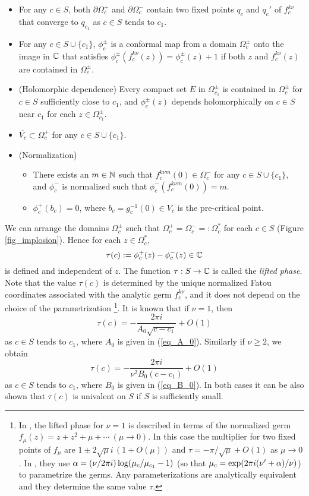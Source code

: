 \begin{itemize}
\item
For any $c \in S$,
both $\partial \Omega_c^+$ and $\partial \Omega_c^-$ contain two fixed points $q_c$ and $q_c'$ 
of $f_c^{k\nu}$ that converge to $q_{c_1}$ as $c \in S$ tends to  $c_1$.
\item 
For any $c \in S \cup \{c_1\}$, 
$\phi_c^\pm$ is a conformal map from a domain $\Omega_c^\pm$ onto the image in $\mathbb C$ that satisfies
$\phi_c^\pm(f_c^{k\nu}(z))=\phi_c^\pm(z)+1$ 
if both $z$ and $f_c^{k\nu}(z)$ are contained in $\Omega_c^\pm$.
\item
(Holomorphic dependence) 
Every compact set $E$ in $\Omega_{c_1}^\pm$ 
is contained in $\Omega_c^\pm$ for $c \in S$ sufficiently close to $c_1$,
and $\phi_c^\pm(z)$ depends holomorphically on $c \in S$ near $c_1$ for each $z \in \Omega_{c_1}^\pm$.
\item
$\overline{V_c} \subset \Omega_c^+$ for any $c \in S \cup \{c_1\}$. 
\item
(Normalization) 
\begin{itemize}
\item
There exists an $m \in \mathbb N$
such that $f_{c}^{k\nu m}(0) \in \Omega_c^-$ 
for any $c \in S \cup \{c_1\}$,
and $\phi_c^-$ is normalized such that $\phi_c^-(f_{c}^{k\nu m}(0))=m$.
\item
$\phi_c^+(b_c)=0$, where $b_c=g_c^{-1}(0) \in V_c$ is the pre-critical point.
\end{itemize}
\end{itemize}
We can arrange the domains $\Omega_c^\pm$
such that $\Omega_c^+=\Omega_c^-=:\Omega_c^\ast$ for each $c \in S$
(Figure \ref{fig_implosion}).
Hence for each $z \in \Omega_c^\ast$, 
$$
\tau(c):=\phi_c^+(z)-\phi_c^-(z) \in \mathbb C
$$
is defined and independent of $z$. 
The function $\tau:S \to \mathbb C$
is called the {\it lifted phase}.
Note that the value $\tau(c)$ is determined 
by the unique normalized Fatou coordinates
associated with the analytic germ $f_c^{k\nu}$,
and it does not depend on the choice of the parametrization
\footnote{
In \cite{Douady 2000}, the lifted phase 
for $\nu=1$ is described 
in terms of the normalized germ
$f_\mu (z)=z+z^2+\mu+\cdots~(\mu \to 0)$.
In this case the multiplier for two fixed points of $f_\mu$ are 
$1 \pm 2 \sqrt{\mu}i\,(1+O(\mu))$ and $\tau=-\pi/\sqrt{\mu}+O(1)$
as $\mu \to 0$. 
In \cite{DSZ 1997}, they use $\alpha=(\nu/2\pi i)\log (\mu_c/\mu_{c_1}-1)$
(so that $\mu_c=\exp(2 \pi i (\nu'+\alpha)/\nu)$)
to parametrize the germs. 
Any parameterizations are analytically equivalent and they determine
the same value $\tau$.
}.
It is known that if $\nu=1$, then
$$
\tau(c)= -\frac{2\pi i}{A_0\sqrt{c-c_1}}+O(1)
$$
as $c \in S$ tends to $c_1$, where $A_0$ is given in (\ref{eq_A_0}).
Similarly if $\nu \ge 2$, we obtain
$$
\tau(c)= -\frac{2 \pi i}{\nu^2 B_0(c-c_1)}+O(1)
$$
as $c \in S$ tends to $c_1$,
where $B_0$ is given in (\ref{eq_B_0}). 
In both cases it can be also shown that $\tau(c)$ is univalent on $S$ if 
$S$ is sufficiently small.



